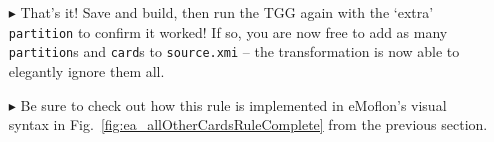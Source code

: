 \begin{itemize}
\item[$\blacktriangleright$] That's it! Save and build, then run the TGG again with the `extra' \texttt{partition} to confirm it worked!
If so, you are now free to add as many \texttt{partition}s and \texttt{card}s to \texttt{source.xmi} -- the transformation is now able to elegantly ignore them all.

\vspace{0.5cm}

\item[$\blacktriangleright$] Be sure to check out how this rule is implemented in eMoflon's visual syntax in Fig.~\ref{fig:ea_allOtherCardsRuleComplete} from
the previous section.

\end{itemize}
